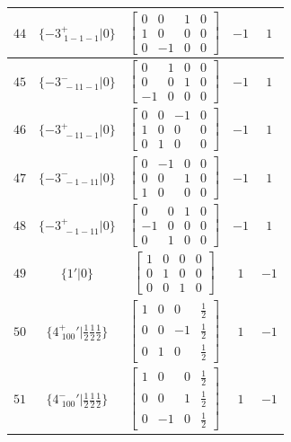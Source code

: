 \documentclass[fleqn,8pt]{jsarticle}
\begin{document}
\begin{longtable}{ccccc}
$ 44 $ & $ \{-3^{+}_{\,\,1-1-1}|0\} $ & $ \begin{bmatrix} 0 & 0 & 1 & 0 \\ 1 & 0 & 0 & 0 \\ 0 & -1 & 0 & 0 \end{bmatrix} $ & $ -1 $ & $ 1 $ \\ \hline
$ 45 $ & $ \{-3^{-}_{\,\,-11-1}|0\} $ & $ \begin{bmatrix} 0 & 1 & 0 & 0 \\ 0 & 0 & 1 & 0 \\ -1 & 0 & 0 & 0 \end{bmatrix} $ & $ -1 $ & $ 1 $ \\ \hline
$ 46 $ & $ \{-3^{+}_{\,\,-11-1}|0\} $ & $ \begin{bmatrix} 0 & 0 & -1 & 0 \\ 1 & 0 & 0 & 0 \\ 0 & 1 & 0 & 0 \end{bmatrix} $ & $ -1 $ & $ 1 $ \\ \hline
$ 47 $ & $ \{-3^{-}_{\,\,-1-11}|0\} $ & $ \begin{bmatrix} 0 & -1 & 0 & 0 \\ 0 & 0 & 1 & 0 \\ 1 & 0 & 0 & 0 \end{bmatrix} $ & $ -1 $ & $ 1 $ \\ \hline
$ 48 $ & $ \{-3^{+}_{\,\,-1-11}|0\} $ & $ \begin{bmatrix} 0 & 0 & 1 & 0 \\ -1 & 0 & 0 & 0 \\ 0 & 1 & 0 & 0 \end{bmatrix} $ & $ -1 $ & $ 1 $ \\ \hline
$ 49 $ & $ \{1{}'|0\} $ & $ \begin{bmatrix} 1 & 0 & 0 & 0 \\ 0 & 1 & 0 & 0 \\ 0 & 0 & 1 & 0 \end{bmatrix} $ & $ 1 $ & $ -1 $ \\ \hline
$ 50 $ & $ \{4^{+}_{\,\,100}{}'|\frac{1}{2} \frac{1}{2} \frac{1}{2}\} $ & $ \begin{bmatrix} 1 & 0 & 0 & \frac{1}{2} \\ 0 & 0 & -1 & \frac{1}{2} \\ 0 & 1 & 0 & \frac{1}{2} \end{bmatrix} $ & $ 1 $ & $ -1 $ \\ \hline
$ 51 $ & $ \{4^{-}_{\,\,100}{}'|\frac{1}{2} \frac{1}{2} \frac{1}{2}\} $ & $ \begin{bmatrix} 1 & 0 & 0 & \frac{1}{2} \\ 0 & 0 & 1 & \frac{1}{2} \\ 0 & -1 & 0 & \frac{1}{2} \end{bmatrix} $ & $ 1 $ & $ -1 $ \\ \hline

\end{longtable}
\end{document}
